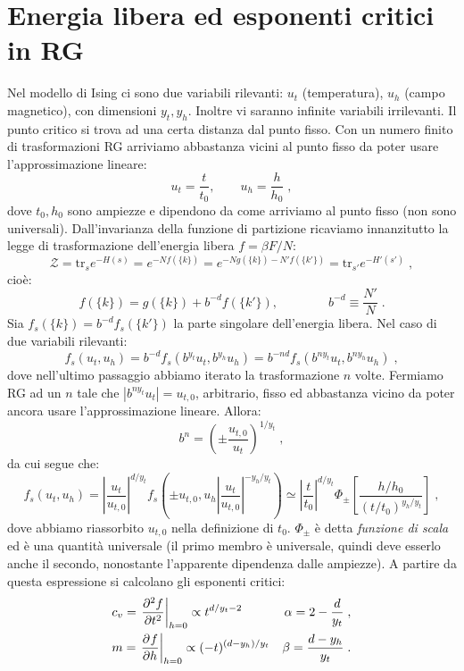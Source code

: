 \documentclass[10pt,a4paper]{report}
\theoremstyle{definition}
\newcommand{\pdev}[3][]{\frac{\partial^{#1} #2}{\partial #3^{#1}}}
\numberwithin{equation}{section}
\newcommand{\tr}{\mathrm{tr}}
\newcommand{\zpart}{\mathcal{Z}}
\begin{document}
\section{Energia libera ed esponenti critici in RG}
Nel modello di Ising ci sono due variabili rilevanti: $u_t$ (temperatura), $u_h$ (campo magnetico), con dimensioni  $y_t,y_h$. Inoltre vi saranno infinite variabili irrilevanti. Il punto critico si trova ad una certa distanza dal punto fisso. Con un numero finito di trasformazioni RG arriviamo abbastanza vicini al punto fisso da poter usare l'approssimazione lineare:
\begin{equation}
u_t=\frac{t}{t_0},\qquad u_h=\frac{h}{h_0}\;,
\end{equation}
dove $t_0,h_0$ sono ampiezze e dipendono da come arriviamo al punto fisso (non sono universali). Dall'invarianza della funzione di partizione ricaviamo innanzitutto la legge di trasformazione dell'energia libera $f=\beta F/N$:
$$
\zpart=\tr_s e^{-H(s)}=e^{-Nf(\{k\})}=e^{-Ng(\{k\})-N'f(\{k'\})}=\tr_{s'}e^{-H'(s')}\;,
$$
cioè:
\begin{equation}
f(\{k\})=g(\{k\})+b^{-d}f(\{k'\}),\qquad\qquad b^{-d}\equiv\frac{N'}{N}\;.
\end{equation}
Sia $f_s(\{k\})=b^{-d}f_s(\{k'\})$ la parte singolare dell'energia libera. Nel caso di due variabili rilevanti:
\begin{equation}
f_s(u_t,u_h)=b^{-d}f_s(b^{y_t}u_t,b^{y_h}u_h)=b^{-nd}f_s(b^{ny_t}u_t,b^{ny_h}u_h)\;,
\end{equation}
dove nell'ultimo passaggio abbiamo iterato la trasformazione $n$ volte. Fermiamo RG ad un $n$ tale che $|b^{ny_t}u_t|=u_{t,0}$, arbitrario, fisso ed abbastanza vicino da poter ancora usare l'approssimazione lineare. Allora:
\begin{equation}
b^n=\left(\pm \frac{u_{t,0}}{u_t}\right)^{1/y_t}\;,
\end{equation}
da cui segue che:
\begin{equation}
f_s(u_t,u_h)=\left|\frac{u_t}{u_{t,0}}\right|^{d/y_t}f_s\left(\pm u_{t,0},u_h\left|\frac{u_t}{u_{t,0}}\right|^{-y_h/y_t}\right)\simeq \left|\frac{t}{t_0}\right|^{d/y_t}\Phi_{\pm}\left[\frac{h/h_0}{(t/t_0)^{y_h/y_t}}\right]\;,
\end{equation}
dove abbiamo riassorbito $u_{t,0}$ nella definizione di $t_0$. $\Phi_{\pm}$ è detta \emph{funzione di scala} ed è una quantità universale (il primo membro è universale, quindi deve esserlo anche il secondo, nonostante l'apparente dipendenza dalle ampiezze). A partire da questa espressione si calcolano gli esponenti critici:
\begin{align}
&c_v=\left.\pdev[2]{f}{t}\right|_{h=0}\propto t^{d/y_t-2} &\alpha=2-\frac{d}{y_t}\;, \notag \\
&m=\left.\pdev{f}{h}\right|_{h=0}\propto (-t)^{(d-y_h)/y_t} &\beta=\frac{d-y_h}{y_t}\;.
\end{align}
\end{document}
